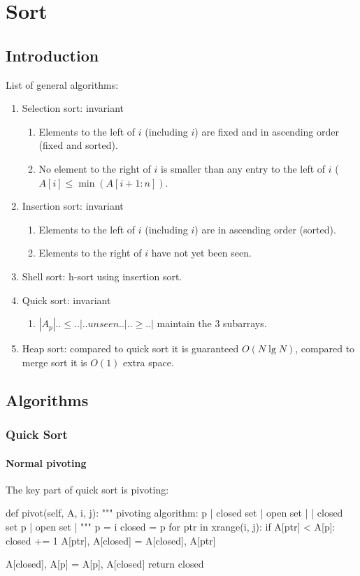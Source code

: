 \chapter{Sort}


\section{Introduction}
List of general algorithms:
\begin{enumerate}
\item Selection sort: invariant
\begin{enumerate}
\item Elements to the left of $i$ (including $i$) are fixed and in ascending order (fixed and sorted).
\item No element to the right of $i$ is smaller than any entry to the left of $i$ ($A[i]  \leq\min(A[i+1:n])$.
\end{enumerate}
\item Insertion sort: invariant
\begin{enumerate}
\item Elements to the left of $i$ (including $i$) are in ascending order (sorted).
\item Elements to the right of $i$ have not yet been seen.
\end{enumerate}
\item Shell sort: h-sort using insertion sort.
\item Quick sort: invariant
\begin{enumerate}
\item $|A_p|..\leq..|..unseen..|..\geq..|$ maintain the 3 subarrays.
\end{enumerate}
\item Heap sort: compared to quick sort it is guaranteed $O(N \lg N)$, compared to merge sort it is $O(1)$ extra space. 
\end{enumerate}

\section{Algorithms}
\subsection{Quick Sort}
\subsubsection{Normal pivoting}
The key part of quick sort is pivoting:
\begin{python}
def pivot(self, A, i, j):
    """
    pivoting algorithm:
    p | closed set | open set |
    | closed set p | open set |
    """
    p = i
    closed = p
    for ptr in xrange(i, j):
        if A[ptr] < A[p]:
            closed += 1
            A[ptr], A[closed] = A[closed], A[ptr]

    A[closed], A[p] = A[p], A[closed]
    return closed
\end{python}

